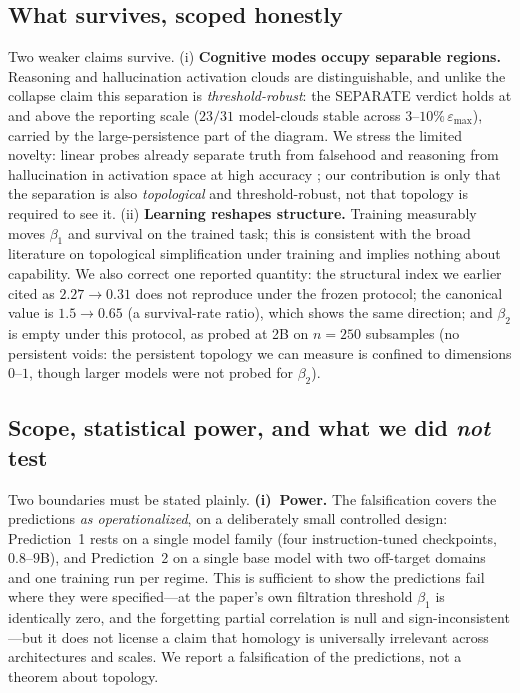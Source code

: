 \documentclass{article}
\begin{document}
\subsection{What survives, scoped honestly}
\label{sec:empirical-survives}
Two weaker claims survive. (i) \textbf{Cognitive modes occupy separable regions.} Reasoning and
hallucination activation clouds are distinguishable, and unlike the collapse claim this
separation is \emph{threshold-robust}: the SEPARATE verdict holds at and above the reporting
scale (\(23/31\) model-clouds stable across \(3\)--\(10\%\,\varepsilon_{\max}\)), carried by the
large-persistence part of the diagram. We stress the limited novelty: linear probes already
separate truth from falsehood and reasoning from hallucination in activation space at high
accuracy \citep{Marks2023geometry}; our contribution is only that the separation is also
\emph{topological} and threshold-robust, not that topology is required to see it. (ii)
\textbf{Learning reshapes structure.} Training measurably moves \(\beta_1\) and survival on the
trained task; this is consistent with the broad literature on topological simplification under
training \citep{Naitzat2020topology} and implies nothing about capability. We also correct one
reported quantity: the structural index we earlier cited as \(2.27 \to 0.31\) does not reproduce
under the frozen protocol; the canonical value is \(1.5 \to 0.65\) (a survival-rate ratio), which
shows the same direction; and \(\beta_2\) is empty under this protocol, as probed at 2B on
\(n=250\) subsamples (no persistent voids: the persistent topology we can measure is confined to
dimensions \(0\)--\(1\), though larger models were not probed for \(\beta_2\)).

\subsection{Scope, statistical power, and what we did \emph{not} test}
\label{sec:empirical-scope}
Two boundaries must be stated plainly. \textbf{(i)~Power.} The falsification covers the predictions
\emph{as operationalized}, on a deliberately small controlled design: Prediction~1 rests on a single
model family (four instruction-tuned checkpoints, \(0.8\)--\(9\)B), and Prediction~2 on a single base
model with two off-target domains and one training run per regime. This is sufficient to show the
predictions fail where they were specified---at the paper's own filtration threshold \(\beta_1\) is
identically zero, and the forgetting partial correlation is null and sign-inconsistent---but it does
not license a claim that homology is universally irrelevant across architectures and scales. We
report a falsification of the predictions, not a theorem about topology.
\end{document}
